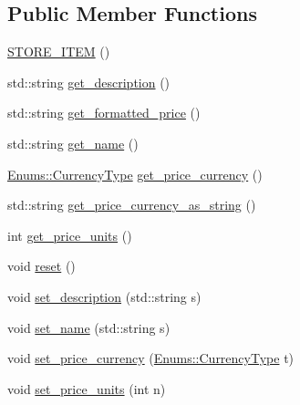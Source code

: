 \subsection*{Public Member Functions}
\begin{DoxyCompactItemize}
\item 
\hyperlink{classAsteroids_1_1Domain_1_1Store_1_1STORE__ITEM_aa90aa58f85cd1600676a65af16f76cef}{S\+T\+O\+R\+E\+\_\+\+I\+T\+EM} ()
\item 
std\+::string \hyperlink{classAsteroids_1_1Domain_1_1Store_1_1STORE__ITEM_af57fe8114a95a44bc03fad64e17717f1}{get\+\_\+description} ()
\item 
std\+::string \hyperlink{classAsteroids_1_1Domain_1_1Store_1_1STORE__ITEM_aec607f6610f24f270da5dbfe7b866c05}{get\+\_\+formatted\+\_\+price} ()
\item 
std\+::string \hyperlink{classAsteroids_1_1Domain_1_1Store_1_1STORE__ITEM_a628bc9964ad941711a6ed5222f514c2b}{get\+\_\+name} ()
\item 
\hyperlink{namespaceAsteroids_1_1Domain_1_1Store_1_1Enums_a995d66dbd6bc566c0765fdcfd7be6006}{Enums\+::\+Currency\+Type} \hyperlink{classAsteroids_1_1Domain_1_1Store_1_1STORE__ITEM_abb6f9fd46295bcac9756d4a82d95db47}{get\+\_\+price\+\_\+currency} ()
\item 
std\+::string \hyperlink{classAsteroids_1_1Domain_1_1Store_1_1STORE__ITEM_a55c625077b78bf51b53880a2a77a8ece}{get\+\_\+price\+\_\+currency\+\_\+as\+\_\+string} ()
\item 
int \hyperlink{classAsteroids_1_1Domain_1_1Store_1_1STORE__ITEM_ad79bef2044b0f10c7e2a08bc84a9d9f2}{get\+\_\+price\+\_\+units} ()
\item 
void \hyperlink{classAsteroids_1_1Domain_1_1Store_1_1STORE__ITEM_a7e148d3efb06f96983ec8adfe2eb3e22}{reset} ()
\item 
void \hyperlink{classAsteroids_1_1Domain_1_1Store_1_1STORE__ITEM_a7732a5820fab5cffffc2d5ed23248068}{set\+\_\+description} (std\+::string s)
\item 
void \hyperlink{classAsteroids_1_1Domain_1_1Store_1_1STORE__ITEM_aa5feba6235011013dd70d1a8d2eab080}{set\+\_\+name} (std\+::string s)
\item 
void \hyperlink{classAsteroids_1_1Domain_1_1Store_1_1STORE__ITEM_ac71b02d04a2de92850b05512125176b6}{set\+\_\+price\+\_\+currency} (\hyperlink{namespaceAsteroids_1_1Domain_1_1Store_1_1Enums_a995d66dbd6bc566c0765fdcfd7be6006}{Enums\+::\+Currency\+Type} t)
\item 
void \hyperlink{classAsteroids_1_1Domain_1_1Store_1_1STORE__ITEM_a1b5772623211b6e34b7f33e4a59495bc}{set\+\_\+price\+\_\+units} (int n)
\end{DoxyCompactItemize}
